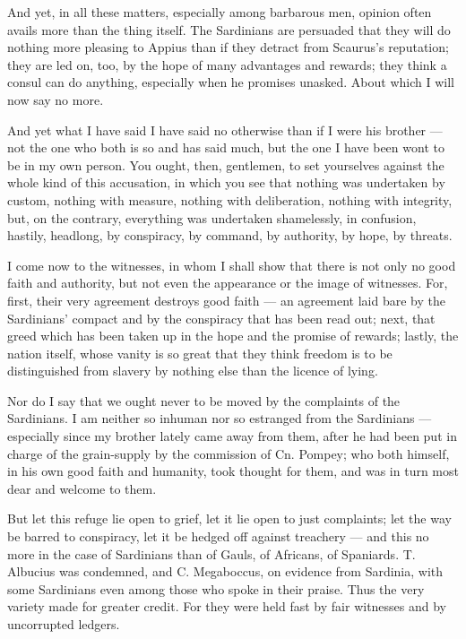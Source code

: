  And yet, in all these matters, especially among barbarous men, opinion often avails more than the thing itself. The Sardinians are persuaded that they will do nothing more pleasing to Appius than if they detract from Scaurus's reputation; they are led on, too, by the hope of many advantages and rewards; they think a consul can do anything, especially when he promises unasked. About which I will now say no more.

 And yet what I have said I have said no otherwise than if I were his brother --- not the one who both is so and has said much, but the one I have been wont to be in my own person. You ought, then, gentlemen, to set yourselves against the whole kind of this accusation, in which you see that nothing was undertaken by custom, nothing with measure, nothing with deliberation, nothing with integrity, but, on the contrary, everything was undertaken shamelessly, in confusion, hastily, headlong, by conspiracy, by command, by authority, by hope, by threats.

 I come now to the witnesses, in whom I shall show that there is not only no good faith and authority, but not even the appearance or the image of witnesses. For, first, their very agreement destroys good faith --- an agreement laid bare by the Sardinians' compact and by the conspiracy that has been read out; next, that greed which has been taken up in the hope and the promise of rewards; lastly, the nation itself, whose vanity is so great that they think freedom is to be distinguished from slavery by nothing else than the licence of lying.

 Nor do I say that we ought never to be moved by the complaints of the Sardinians. I am neither so inhuman nor so estranged from the Sardinians --- especially since my brother lately came away from them, after he had been put in charge of the grain-supply by the commission of Cn. Pompey; who both himself, in his own good faith and humanity, took thought for them, and was in turn most dear and welcome to them.

 But let this refuge lie open to grief, let it lie open to just complaints; let the way be barred to conspiracy, let it be hedged off against treachery --- and this no more in the case of Sardinians than of Gauls, of Africans, of Spaniards. T. Albucius was condemned, and C. Megaboccus, on evidence from Sardinia, with some Sardinians even among those who spoke in their praise. Thus the very variety made for greater credit. For they were held fast by fair witnesses and by uncorrupted ledgers.


